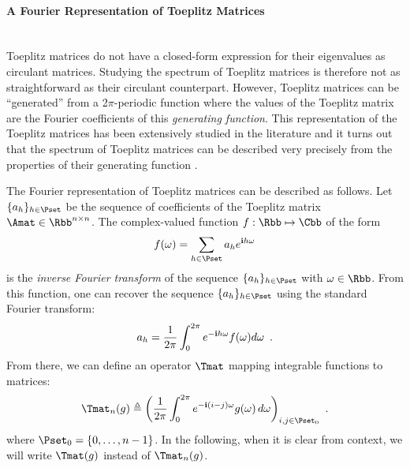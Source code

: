 \paragraph{A Fourier Representation of Toeplitz Matrices} ~\\

Toeplitz matrices do not have a closed-form expression for their eigenvalues as circulant matrices.
Studying the spectrum of Toeplitz matrices is therefore not as straightforward as their circulant counterpart.
However, Toeplitz matrices can be ``generated'' from a 2$\pi$-periodic function where the values of the Toeplitz matrix are the Fourier coefficients of this \emph{generating function}.
This representation of the Toeplitz matrices has been extensively studied in the literature and it turns out that the spectrum of Toeplitz matrices can be described very precisely from the properties of their generating function \cite{serra1997extension,grenander1958toeplitz,parter1961extreme,avram1988bilinear,widom1965toeplitz,tilli1997asymptotic,tyrtyshnikov1998spectra,tilli1998singular,tilli1997asymptotic}.

The Fourier representation of Toeplitz matrices can be described as follows.
Let $\{a_h\}_{h \in \Pset}$ be the sequence of coefficients of the Toeplitz matrix $\Amat \in \Rbb^{n\times n}$.
The complex-valued function $f: \Rbb \mapsto \Cbb$ of the form
\begin{equation}
  f(\omega) = \sum_{h \in \Pset} a_h e^{\ci h \omega}
\end{equation}
is the \emph{inverse Fourier transform} of the sequence $\{a_h\}_{h \in \Pset}$ with $\omega \in \Rbb$.
From this function, one can recover the sequence $\{a_h\}_{h \in \Pset}$ using the standard Fourier transform:
\begin{equation}
  a_h = \frac{1}{2\pi} \int_0^{2\pi} e^{-\mathbf{i} h \omega} f(\omega) d\omega \enspace.
\end{equation}
\noindent
From there, we can define an operator $\Tmat$ mapping integrable functions to matrices:
\begin{equation} \label{equation:ch2-toeplitz_operator}
  \Tmat_n(g) \triangleq \leftmat\frac{1}{2\pi}\int_{0}^{2\pi}e^{-\ci(i-j)\omega}g(\omega)\,d\omega\rightmat_{i,j \in \Pset_0} \enspace.
\end{equation}
where $\Pset_0 = \{0, \ldots, n-1\}$.
In the following, when it is clear from context, we will write $\Tmat(g)$ instead of $\Tmat_n(g)$.

